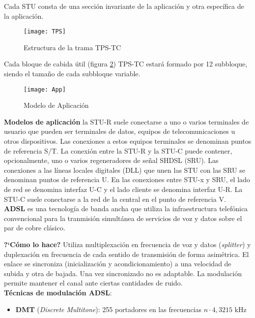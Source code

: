 \documentclass[10pt,portrait, twocolumn]{article}
\begin{document}
Cada STU consta de una sección invariante de la aplicación y otra específica de la aplicación. \\

\begin{figure}[!ht]
	\centering
    	\texttt{[image: TPS]}
	\caption{Estructura de la trama TPS-TC}
	\label{fig:TPS}
  \end{figure}
  
Cada bloque de cabida útil (figura \ref{fig:TPS}) TPS-TC  estará formado por 12 subbloque, siendo el tamaño de cada subbloque variable.\\  
  
\begin{figure}[!ht]
	\centering
    	\texttt{[image: App]}
	\caption{Modelo de Aplicación}
	\label{fig:TPS}
  \end{figure}  
  
  
\textbf{Modelos de aplicación} la STU-R suele conectarse a uno o varios terminales de usuario que pueden ser terminales de datos, equipos de telecomunicaciones u otros dispositivos. Las conexiones a estos equipos terminales se denominan puntos de referencia S/T. La conexión entre la STU-R y la STU-C puede contener, opcionalmente, uno o varios regeneradores de señal SHDSL (SRU). Las conexiones a las líneas locales digitales (DLL) que unen las STU con las SRU se denominan puntos de referencia U. En las conexiones entre STU-x y SRU, el lado de red se denomina interfaz U-C y el lado cliente se denomina interfaz U-R. La STU-C suele conectarse a la red de la central en el punto de referencia V.\\  
  
  
\textbf{ADSL} es una tecnología de banda ancha que utiliza la infraestructura telefónica convencional para la tranmisión simultánea de servicios de voz y datos sobre el par de cobre clásico.

\quad \textbf{?`Cómo lo hace?} Utiliza multiplexación en frecuencia de voz y datos (\textit{splitter}) y duplexación en frecuencia de cada sentido de transmisión de forma asimétrica. El enlace se sincroniza (inicialización y acondicionamiento) a una velocidad de subida y otra de bajada. Una vez sincronizado no es adaptable. La modulación permite mantener el canal ante ciertas cantidades de ruido.\\

\textbf{Técnicas de modulación ADSL}:

	\begin{itemize}
		\item \textbf{DMT} (\textit{Discrete Multitone}): 255 portadores en las frecuencias $n \cdot 4,3215$ kHz
	\end{itemize}
	
\end{document}
